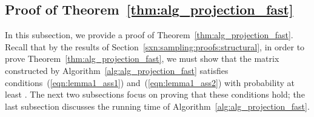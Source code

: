 \documentclass[11pt]{article}
\begin{document}
\subsection{Proof of Theorem~\ref{thm:alg_projection_fast}}
\label{sxn:projection:proofs}

In this subsection, we provide a proof of Theorem~\ref{thm:alg_projection_fast}. Recall that by the results of Section~\ref{sxn:sampling:proofs:structural}, in order to prove Theorem~\ref{thm:alg_projection_fast}, we must show that the matrix  constructed by Algorithm~\ref{alg:alg_projection_fast} satisfies conditions~(\ref{eqn:lemma1_ass1}) and~(\ref{eqn:lemma1_ass2}) with probability at least . The next two subsections focus on proving that these conditions hold; the last subsection discusses the running time of Algorithm~\ref{alg:alg_projection_fast}.
\end{document}
